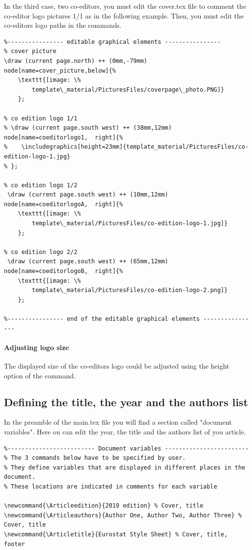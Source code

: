 \documentclass[Theme1]{{template_material/eurostat}}
\newcommand{\Articleedition}{2019 edition} %
\newcommand{\Articleauthors}{Author One, Author Two, Author Three} %
\newcommand{\Articletitle}{Eurostat Style Sheet} %
\begin{document}
In the third case, two co-editors, you must edit the cover.tex file to comment the co-editor logo pictures 1/1 as in the following example. Then, you must edit the co-editors logo paths in the  commands.
\begin{verbatim}
%---------------- editable graphical elements ----------------
% cover picture
\draw (current page.north) ++ (0mm,-79mm) node[name=cover_picture,below]{%
    \texttt{[image: \%
        template\_material/PicturesFiles/coverpage\_photo.PNG]}
    };

% co edition logo 1/1
% \draw (current page.south west) ++ (38mm,12mm) node[name=coeditorlogo1,  right]{%
%    \includegraphics[height=23mm]{template_material/PicturesFiles/co-edition-logo-1.jpg}
% }; 
     
% co edition logo 1/2
 \draw (current page.south west) ++ (10mm,12mm) node[name=coeditorlogoA,  right]{%
    \texttt{[image: \%
        template\_material/PicturesFiles/co-edition-logo-1.jpg]}
    }; 
     
% co edition logo 2/2
 \draw (current page.south west) ++ (65mm,12mm) node[name=coeditorlogoB,  right]{%
    \texttt{[image: \%
        template\_material/PicturesFiles/co-edition-logo-2.png]}
    }; 

%---------------- end of the editable graphical elements ----------------
\end{verbatim}

\paragraph{Adjusting logo size}

The displayed size of the co-editors logo could be adjusted using the height option of the  command.

\newpage
\subsection{Defining the title, the year and the authors list}

In the preamble of the main.tex file you will find a section called "document variables". Here ou can edit the year, the title and the authors list of you article. 

\begin{verbatim}
%------------------------- Document variables ------------------------
% The 3 commands below have to be specified by user.
% They define variables that are displayed in different places in the document. 
% These locations are indicated in comments for each variable

\newcommand{\Articleedition}{2019 edition} % Cover, title
\newcommand{\Articleauthors}{Author One, Author Two, Author Three} % Cover, title
\newcommand{\Articletitle}{Eurostat Style Sheet} % Cover, title, footer
\end{verbatim}
\end{document}
